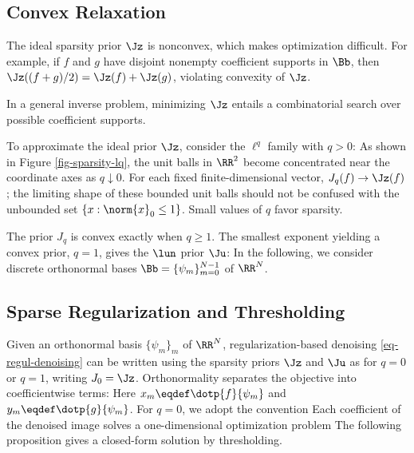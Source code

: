                                                                       
\subsection{Convex Relaxation}

The ideal sparsity prior $\Jz$ is nonconvex, which makes optimization difficult. For example, if $f$ and $g$ have disjoint nonempty coefficient supports in $\Bb$, then $\Jz( (f+g)/2 ) = \Jz(f)+\Jz(g)$, violating convexity of $\Jz$.

In a general inverse problem, minimizing $\Jz$ entails a combinatorial search over possible coefficient supports.

To approximate the ideal prior $\Jz$, consider the $\ell^q$ family with $q>0$:
As shown in Figure \ref{fig-sparsity-lq}, the unit balls in $\RR^2$ become concentrated near the coordinate axes as $q\downarrow0$. For each fixed finite-dimensional vector, $J_q(f)\to\Jz(f)$; the limiting shape of these bounded unit balls should not be confused with the unbounded set $\{x:\norm{x}_0\leq1\}$. Small values of $q$ favor sparsity.




The prior $J_q$ is convex exactly when $q \geq 1$. The smallest exponent yielding a convex prior, $q=1$, gives the $\lun$ prior $\Ju$:
In the following, we consider discrete orthonormal bases $\Bb = \{\psi_m\}_{m=0}^{N-1}$ of $\RR^N$.


                                                                      
\subsection{Sparse Regularization and Thresholding}

Given an orthonormal basis $\{\psi_m\}_m$ of $\RR^N$, regularization-based denoising \eqref{eq-regul-denoising} can be written using the sparsity priors $\Jz$ and $\Ju$ as
for $q=0$ or $q=1$, writing $J_0=\Jz$. Orthonormality separates the objective into coefficientwise terms:
Here $x_m \eqdef \dotp{f}{\psi_m}$ and $y_m \eqdef \dotp{g}{\psi_m}$. For $q=0$, we adopt the convention
Each coefficient of the denoised image solves a one-dimensional optimization problem
The following proposition gives a closed-form solution by thresholding.

